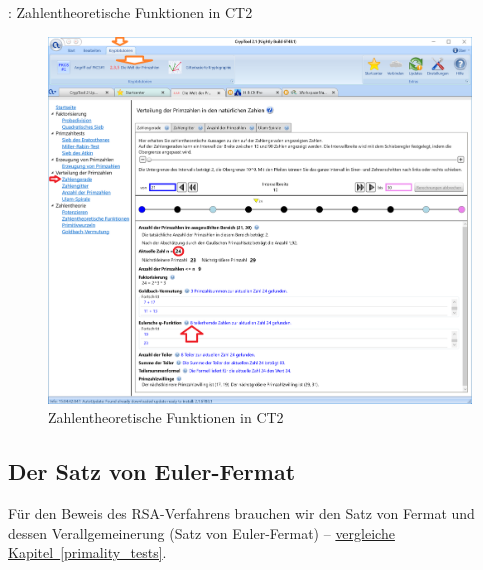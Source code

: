 \begin{refsegment}
\begin{remark}{: Zahlentheoretische Funktionen in CT2}
\begin{figure}[!hb]
\begin{center}
\includegraphics[scale=0.46]{figures/Euler-phi-of-24_in_CT2-WoP.png}
\caption[Zahlentheoretische Funktionen in CT2]
        {Zahlentheoretische Funktionen in CT2\protect\footnotemark}
\label{Euler-phi-of-24_in_CT2-WoP-figure}
\end{center}
\end{figure}

\end{remark}





\subsection{Der Satz von Euler-Fermat}
\label{Label_KleinerSatzFermat-chap3}
Für den Beweis des RSA-Verfahrens brauchen wir den Satz von Fermat und
dessen Verallgemeinerung (Satz von Euler-Fermat) --
\hyperlink{KleinerSatzFermat-chap2}{vergleiche Kapitel~\ref{primality_tests}}.

\hypertarget{KleinerSatzFermat-chap3}{}


\end{refsegment}
